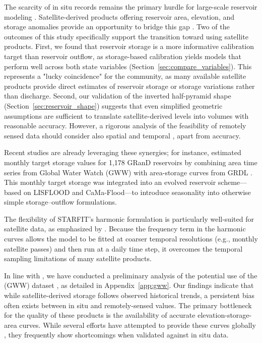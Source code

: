 \documentclass[hess, manuscript]{copernicus}
\providecommand{\DIFadd}[1]{{\protect\color{blue}\uwave{#1}}} %
\providecommand{\DIFaddbegin}{} %
\providecommand{\DIFaddend}{} %
\begin{document}
The scarcity of in situ records remains the primary hurdle for large-scale reservoir modeling \citep{Shen2025}. Satellite-derived products offering reservoir area, elevation, and storage anomalies provide an opportunity to bridge this gap \citep{Zhao2018, Schwatke2020, Donchyts2022, Khandelwal2022, Hao2024, Hou2024}. Two of the outcomes of this study specifically support the transition toward using satellite products. First, we found that reservoir storage is a more informative calibration target than reservoir outflow, as storage-based calibration yields models that perform well across both state variables (Section~\ref{sec:compare_variables}). This represents a "lucky coincidence" for the community, as many available satellite products provide direct estimates of reservoir storage or storage variations rather than discharge. Second, our validation of the inverted half-pyramid shape (Section~\ref{sec:reservoir_shape}) suggests that even simplified geometric assumptions are sufficient to translate satellite-derived levels into volumes with reasonable accuracy. However, a rigorous analysis of the feasibility of remotely sensed data should consider also spatial and temporal \DIFaddbegin \DIFadd{resolution}\DIFaddend , apart from accuracy.

Recent studies are already leveraging these synergies; for instance, \citet{Shen2025} estimated monthly target storage values for 1,178 GRanD reservoirs by combining area time series from Global Water Watch (GWW) \citep{Donchyts2022} with area-storage curves from GRDL \citep{Hao2024}. This monthly target storage was integrated into an evolved reservoir scheme—based on LISFLOOD and CaMa-Flood—to introduce seasonality into otherwise simple storage--outflow formulations. 

The flexibility of STARFIT’s harmonic formulation is particularly well-suited for satellite data, as emphasized by \citet{Steyaert2025}. Because the frequency term in the harmonic curves allows the model to be fitted at coarser temporal resolutions (e.g., monthly satellite passes) and then run at a daily time step, it overcomes the temporal sampling limitations of many satellite products.

In line with \citet{Shen2025}, we have conducted a preliminary analysis of the potential use of the (GWW) dataset \citep{Donchyts2022}, as detailed in Appendix~\ref{app:gww}. Our findings indicate that while satellite-derived storage follows observed historical trends, a persistent bias often exists between in situ and remotely-sensed values. The primary bottleneck for the quality of these products is the availability of accurate elevation-storage-area curves. While several efforts have attempted to provide these curves globally \citep{Yigzaw2018, Busker2019, Khazaei2022}, they frequently show shortcomings when validated against in situ data.
\end{document}
